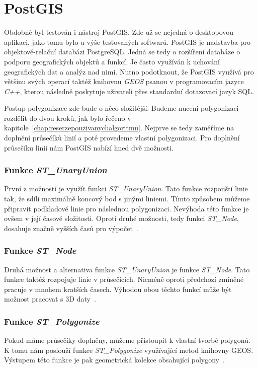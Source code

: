 \section{PostGIS}
Obdobně byl testován i nástroj PostGIS. Zde už se nejedná o
desktopovou aplikaci, jako tomu bylo u výše testovaných
softwarů. PostGIS je nadstavba pro objektově-relační databázi
PostgreSQL. Jedná se tedy o rozšíření databáze o podporu
geo\-grafických objektů a funkcí. Je často využíván k uchování
geografických dat a analýz nad nimi. Nutno podotknout, že PostGIS
využívá pro většinu svých o\-pe\-ra\-cí taktéž knihovnu \textit{GEOS}
psanou v programovacím jazyce \textit{C++}, kterou následně poskytuje
uživateli přes standardní dotazovací jazyk SQL.
	
Postup polygonizace zde bude o něco složitější. Budeme nuceni
polygonizaci rozdělit do dvou kroků, jak bylo řečeno v
kapitole~\ref{chap:reserzepouzivanychalgoritmu}. Nejprve se tedy
zaměříme na doplnění průsečíků linií a poté provedeme vlastní
polygonizaci. Pro doplnění průsečíku linií nám PostGIS nabízí hned dvě
možnosti.
	
\subsubsection{Funkce \textit{ST\_UnaryUnion}}
První z možností je využít funkci \textit{ST\_UnaryUnion}. Tato funkce
rozpouští linie tak, že sdílí maximálně koncový bod s jinými
liniemi. Tímto způsobem můžeme připravit podkladové linie pro
následnou polygonizaci. Nevýhoda této funkce je ovšem v její časové
složitosti. Oproti druhé možnosti, tedy funkci \textit{ST\_Node},
dosahuje značně vyšších časů pro výpočet~\citep{PostGIS_software}.
	
\subsubsection{Funkce \textit{ST\_Node}}
Druhá možnost a alternativa funkce \textit{ST\_UnaryUnion} je funkce
\textit{ST\_Node}. Tato funkce taktéž rozpojuje linie v
průsečících. Nicméně oproti předchozí zmíněné pracuje v mnohem
kratších časech. Výhodou obou těchto funkcí může být možnost pracovat
s 3D daty~\cite{PostGIS_software}.


\subsubsection{Funkce \textit{ST\_Polygonize}}
Pokud máme průsečíky doplněny, můžeme přistoupit k vlastní tvorbě
polygonů. K tomu nám poslouží funkce \textit{ST\_Polygonize}
využívající metod knihovny GEOS. Výstupem této funkce je pak
geometrická kolekce obsahující polygony~\cite{PostGIS_software}.


